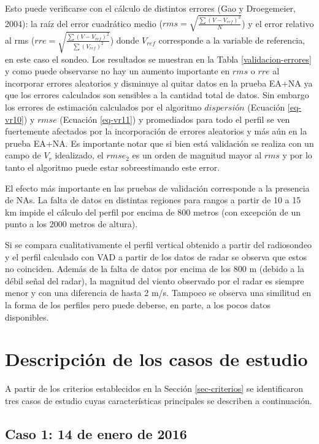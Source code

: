 \documentclass[12pt,spanish,oneside, a4paper]{book}
\begin{document}
\newpage

Esto puede verificarse con el cálculo de distintos errores (Gao y
Droegemeier, 2004): la raíz del error cuadrático medio
(\(rms = \sqrt{ \frac{\sum (V-V_{ref})^2}{N} }\)) y el error relativo al
rms (\(rre = \sqrt{ \frac{\sum (V-V_{ref})^2}{\sum (V_{ref})^2} }\))
donde \(V_{ref}\) corresponde a la variable de referencia, en este caso
el sondeo. Los resultados se muestran en la Tabla
\ref{validacion-errores} y como puede observarse no hay un aumento
importante en \(rms\) o \(rre\) al incorporar errores aleatorios y
disminuye al quitar datos en la prueba EA+NA ya que los errores
calculados son sensibles a la cantidad total de datos. Sin embargo los
errores de estimación calculados por el algoritmo \(dispersión\)
(Ecuación \ref{eq-vr10}) y \(rmse\) (Ecuación \ref{eq-vr11}) y
promediados para todo el perfil se ven fuertemente afectados por la
incorporación de errores aleatorios y más aún en la prueba EA+NA. Es
importante notar que si bien está validación se realiza con un campo de
\(V_r\) idealizado, el \(rmse_2\) es un orden de magnitud mayor al
\(rms\) y por lo tanto el algoritmo puede estar sobreestimando este
error.

El efecto más importante en las pruebas de validación corresponde a la
presencia de NAs. La falta de datos en distintas regiones para rangos a
partir de 10 a 15 km impide el cálculo del perfil por encima de 800
metros (con excepción de un punto a los 2000 metros de altura).

Si se compara cualitativamente el perfil vertical obtenido a partir del
radiosondeo y el perfil calculado con VAD a partir de los datos de radar
se observa que estos no coinciden. Además de la falta de datos por
encima de los 800 m (debido a la débil señal del radar), la magnitud del
viento observado por el radar es siempre menor y con una diferencia de
hasta 2 m/s. Tampoco se observa una similitud en la forma de los
perfiles pero puede deberse, en parte, a los pocos datos disponibles.

\section{Descripción de los casos de
estudio}\label{descripcion-de-los-casos-de-estudio}

A partir de los criterios establecidos en la Sección \ref{sec-criterios}
se identificaron tres casos de estudio cuyas características principales
se describen a continuación.

\subsection{Caso 1: 14 de enero de
2016}\label{caso-1-14-de-enero-de-2016}
\end{document}
